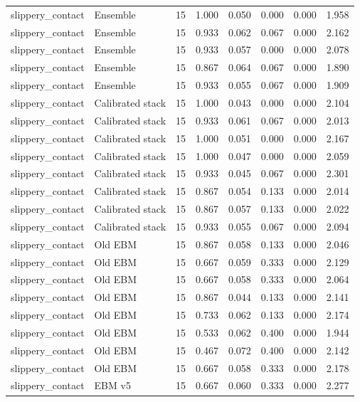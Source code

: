 {\begin{longtable}{llrrrrrr}
slippery\_contact & Ensemble & 15 & 1.000 & 0.050 & 0.000 & 0.000 & 1.958 \\
slippery\_contact & Ensemble & 15 & 0.933 & 0.062 & 0.067 & 0.000 & 2.162 \\
slippery\_contact & Ensemble & 15 & 0.933 & 0.057 & 0.000 & 0.000 & 2.078 \\
slippery\_contact & Ensemble & 15 & 0.867 & 0.064 & 0.067 & 0.000 & 1.890 \\
slippery\_contact & Ensemble & 15 & 0.933 & 0.055 & 0.067 & 0.000 & 1.909 \\
slippery\_contact & Calibrated stack & 15 & 1.000 & 0.043 & 0.000 & 0.000 & 2.104 \\
slippery\_contact & Calibrated stack & 15 & 0.933 & 0.061 & 0.067 & 0.000 & 2.013 \\
slippery\_contact & Calibrated stack & 15 & 1.000 & 0.051 & 0.000 & 0.000 & 2.167 \\
slippery\_contact & Calibrated stack & 15 & 1.000 & 0.047 & 0.000 & 0.000 & 2.059 \\
slippery\_contact & Calibrated stack & 15 & 0.933 & 0.045 & 0.067 & 0.000 & 2.301 \\
slippery\_contact & Calibrated stack & 15 & 0.867 & 0.054 & 0.133 & 0.000 & 2.014 \\
slippery\_contact & Calibrated stack & 15 & 0.867 & 0.057 & 0.133 & 0.000 & 2.022 \\
slippery\_contact & Calibrated stack & 15 & 0.933 & 0.055 & 0.067 & 0.000 & 2.094 \\
slippery\_contact & Old EBM & 15 & 0.867 & 0.058 & 0.133 & 0.000 & 2.046 \\
slippery\_contact & Old EBM & 15 & 0.667 & 0.059 & 0.333 & 0.000 & 2.129 \\
slippery\_contact & Old EBM & 15 & 0.667 & 0.058 & 0.333 & 0.000 & 2.064 \\
slippery\_contact & Old EBM & 15 & 0.867 & 0.044 & 0.133 & 0.000 & 2.141 \\
slippery\_contact & Old EBM & 15 & 0.733 & 0.062 & 0.133 & 0.000 & 2.174 \\
slippery\_contact & Old EBM & 15 & 0.533 & 0.062 & 0.400 & 0.000 & 1.944 \\
slippery\_contact & Old EBM & 15 & 0.467 & 0.072 & 0.400 & 0.000 & 2.142 \\
slippery\_contact & Old EBM & 15 & 0.667 & 0.058 & 0.333 & 0.000 & 2.178 \\
slippery\_contact & EBM v5 & 15 & 0.667 & 0.060 & 0.333 & 0.000 & 2.277 \\

\end{longtable}}
